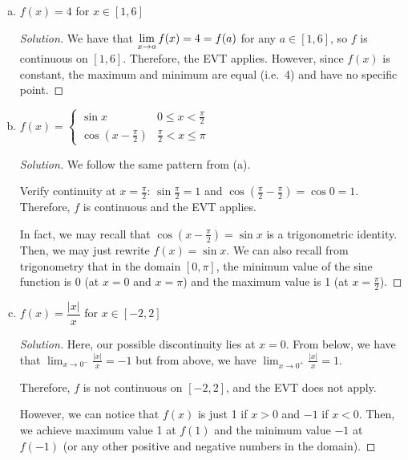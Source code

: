 \documentclass{agony}
\begin{document}
\begin{enumerate}[(a)]
\begin{proof}[Solution]
          Recall that $e^x$ decreases for decreasing $x$ and $e^{-x}$ decreases for increasing $x$.
          Therefore, $f$ has no minimum value, since it approaches 0 as $x\to\pm\infty$.
          However, for the same reasons, $f$ has its maximum value at $f(0)=1$.
        \end{proof}
  \item $f(x)=4$ for $x \in [1,6]$
        \begin{proof}[Solution]
          We have that $\lim\limits_{x\to a}f(x)=4=f(a)$ for any $a\in[1,6]$, so $f$ is continuous on $[1,6]$.
          Therefore, the EVT applies.
          However, since $f(x)$ is constant, the maximum and minimum are equal (i.e.\ 4) and have no specific point.
        \end{proof}
  \item $f(x)=\begin{cases}
            \sin x                & 0 \leq x < \frac{\pi}{2}   \\
            \cos(x-\frac{\pi}{2}) & \frac{\pi}{2} < x \leq \pi
          \end{cases}$
        \begin{proof}[Solution]
          We follow the same pattern from (a).

          Verify continuity at $x=\frac\pi2$:
          $\sin \frac\pi2 = 1$ and $\cos(\frac\pi2-\frac\pi2)=\cos 0=1$.
          Therefore, $f$ is continuous and the EVT applies.

          In fact, we may recall that $\cos(x-\frac\pi2)=\sin x$ is a trigonometric identity.
          Then, we may just rewrite $f(x)=\sin x$.
          We can also recall from trigonometry that in the domain $[0,\pi]$,
          the minimum value of the sine function is 0 (at $x=0$ and $x=\pi$)
          and the maximum value is 1 (at $x=\frac\pi2$).
        \end{proof}
  \item $f(x) = \dfrac{|x|}{x}$ for $x \in [-2,2]$
        \begin{proof}[Solution]
          Here, our possible discontinuity lies at $x=0$.
          From below, we have that $\lim_{x\to0^-}\frac{|x|}{x} = -1$
          but from above, we have $\lim_{x\to0^+}\frac{|x|}{x} = 1$.

          Therefore, $f$ is not continuous on $[-2,2]$, and the EVT does not apply.

          However, we can notice that $f(x)$ is just 1 if $x>0$ and $-1$ if $x<0$.
          Then, we achieve maximum value 1 at $f(1)$ and the minimum value $-1$ at $f(-1)$
          (or any other positive and negative numbers in the domain).
        \end{proof}
\end{enumerate}
\end{document}
